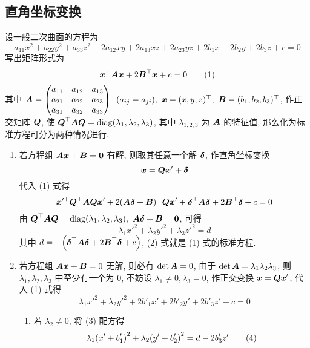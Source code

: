 \subsection{直角坐标变换}

设一般二次曲面的方程为
$$a_{11}x^2+a_{22}y^2+a_{33}z^2+2a_{12}xy+2a_{13}xz+2a_{23}yz+2b_1x+2b_2y+2b_3z+c=0$$
写出矩阵形式为
\begin{equation*}
    \vb*{x}^\top\vb*{Ax}+2\vb*{B}^\top\vb*{x}+c=0
    \tag{1}
\end{equation*}
其中 $\vb*{A}=\mqty(\xmat*{a}{3}{3})~~(a_{ij}=a_{ji}),~\vb*{x}=(x,y,z)^\top,~\vb*{B}=(b_1,b_2,b_3)^\top$,
作正交矩阵 $\vb*{Q}$, 使 $\vb*{Q}^\top\vb*{AQ}=\mathrm{diag}(\lambda_1,\lambda_2,\lambda_3)$, 其中 $\lambda_{1,2,3}$ 为 $\vb*{A}$ 的特征值, 那么化为标准方程可分为两种情况进行.
\begin{enumerate}[label=(\arabic{*})]
    \item 若方程组 $\vb*{Ax}+\vb*{B}=\vb*{0}$ 有解, 则取其任意一个解 $\vb*{\delta}$, 作直角坐标变换 $$\vb*{x}=\vb*{Qx}'+\vb*{\delta}$$ 代入 (1) 式得
          $$\vb*{x}'^\top\vb*{Q}^\top\vb*{AQx}'+2(\vb*{A\delta}+\vb*{B})^\top\vb*{Qx}'+\vb*{\delta}^\top\vb*{A\delta}+2\vb*{B}^\top\vb*{\delta}+c=0$$
          由 $\vb*{Q}^\top\vb*{AQ}=\mathrm{diag}(\lambda_1,\lambda_2,\lambda_3),~\vb*{A\delta}+\vb*{B}=\vb*{0}$, 可得
          \begin{equation*}
              \lambda_1 x'^2+\lambda_2 y'^2+\lambda_3 z'^2=d
              \tag{2}
          \end{equation*}
          其中 $d=-\qty(\vb*{\delta}^\top\vb*{A\delta}+2\vb*{B}^\top\vb*{\delta}+c)$, (2) 式就是 (1) 式的标准方程.
    \item 若方程组 $\vb*{Ax}+\vb*{B}=0$ 无解, 则必有 $\det\vb*{A}=0$, 由于 $\det\vb*{A}=\lambda_1\lambda_2\lambda_3$, 则 $\lambda_1,\lambda_2,\lambda_3$ 中至少有一个为 0, 不妨设 $\lambda_1\neq 0,\lambda_3=0$, 作正交变换 $\vb*{x}=\vb*{Qx}'$, 代入 (1) 式得
          \begin{equation*}
              \lambda_1x'^2+\lambda_2y'^2+2b'_1x'+2b'_2y'+2b'_3z'+c=0
              \tag{3}
          \end{equation*}
          \begin{enumerate}[label=(\roman{*})]
              \item 若 $\lambda_2\neq0$, 将 (3) 配方得
                    \begin{equation*}
                        \lambda_1\qty(x'+b_1')^2+\lambda_2\qty(y'+b_2')^2=d-2b_3'z'
                        \tag{4}
                    \end{equation*}

\end{enumerate}
\end{enumerate}
